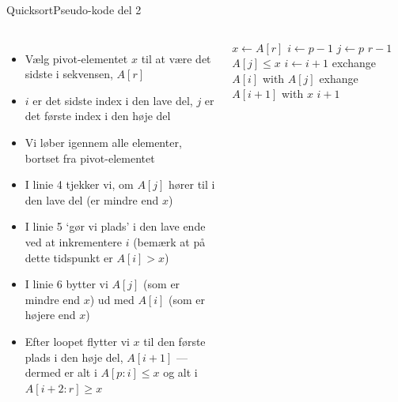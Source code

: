 \documentclass[aspectratio=1610]{beamer}
\begin{document}
\begin{frame}{Quicksort}{Pseudo-kode del 2}
    \begin{columns}

        \begin{itemize}[<+->]
            \small
            \item Vælg \alert{pivot-elementet} $x$ til at være det sidste i
                sekvensen, $A[r]$
            \item $i$ er det sidste index i den lave del, $j$ er det første
                index i den høje del
            \item Vi løber igennem alle elementer, bortset fra pivot-elementet
            \item I linie 4 tjekker vi, om $A[j]$ hører til i den lave del (er
                mindre end $x$)
            \item I linie 5 `gør vi plads' i den lave ende ved at inkrementere
                $i$ (bemærk at på dette tidspunkt er $A[i] > x$)
            \item I linie 6 bytter vi $A[j]$ (som er mindre end $x$) ud med
                $A[i]$ (som er højere end $x$)
            \item Efter loopet flytter vi $x$ til den første plads i den høje
                del, $A[i + 1]$ --- dermed er alt i $A[p:i] \leq x$ og alt i
                $A[i+2:r] \geq x$
        \end{itemize}


        \begin{minipage}{\textwidth}
            \centering
            \begin{tcolorbox}

                \vspace{-\abovedisplayskip}
                \begin{codebox}
                    \li $x \gets A[r]$
                    \li $i \gets p-1$
                    \li \For $j \gets p$ \To $r-1$
                        \Do
                    \li     \If $A[j] \leq x$ \Then
                    \li         $i \gets i + 1$
                    \li         exchange $A[i]$ with $A[j]$
                            \End
                        \End
                    \li exhange $A[i+1]$ with $x$
                    \li \Return $i+1$
                \end{codebox}
            \end{tcolorbox}
        \end{minipage}
        
    \end{columns}
\end{frame}
\end{document}
